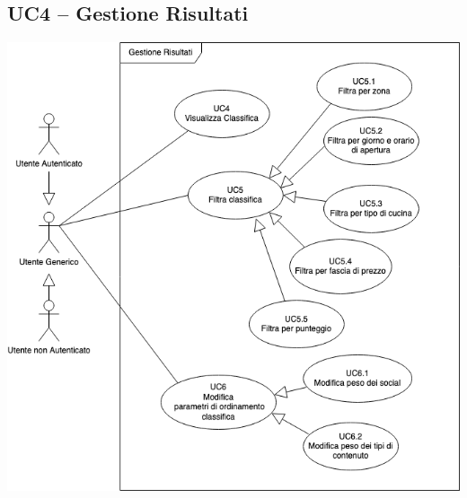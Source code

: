 \subsection{UC4 – Gestione Risultati}
\begin{center}
\includegraphics[scale=0.5]{UC_images/UC4.png}
\end{center}
